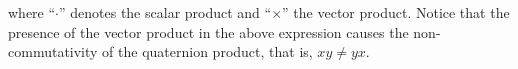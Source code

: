 \documentclass[review]{elsarticle}
\theoremstyle{plain}
\theoremstyle{remark}
\theoremstyle{plain}
\theoremstyle{definition}
\theoremstyle{prop}
\theoremstyle{definition}
\theoremstyle{plain}
\theoremstyle{plain}
\begin{document}
where ``$\cdot$'' denotes the scalar product and ``$\times$'' the vector product. Notice that the presence of the vector product in the above expression causes the non-commutativity of the quaternion product, that is, $xy\neq yx$.
\end{document}
